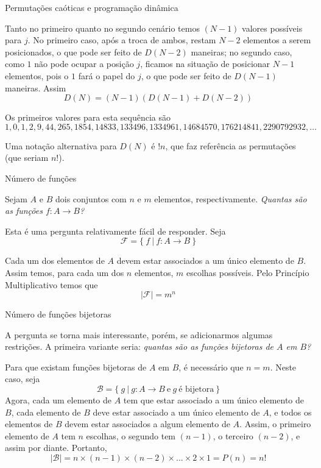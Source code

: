 \begin{frame}[fragile]{Permutações caóticas e programação dinâmica}

Tanto no primeiro quanto no segundo cenário temos $(N - 1)$ valores possíveis para $j$. No primeiro
caso, após a troca de ambos, restam $N - 2$ elementos a serem posicionados, o que pode ser 
feito de $D(N - 2)$ maneiras; no segundo caso, como $1$ não pode ocupar a posição $j$, ficamos
na situação de posicionar $N - 1$ elementos, pois o $1$ fará o papel do $j$, o que pode ser
feito de $D(N - 1)$ maneiras. Assim
\[
        D(N) = (N - 1)(D(N - 1) + D(N - 2))
\]

Os primeiros valores para esta sequência são
\[
1, 0, 1, 2, 9, 44, 265, 1854, 14833, 133496, 1334961, 14684570, 176214841, 2290792932, \ldots
\]

Uma notação alternativa para $D(N)$ é $!n$, que faz referência as permutações (que seriam $n!$).

\end{frame}

\begin{frame}[fragile]{Número de funções}

Sejam $A$ e $B$ dois conjuntos com $n$ e $m$ elementos, respectivamente. {\it Quantas são as funções $f: A \to B$?}

Esta é uma pergunta relativamente fácil de responder. Seja 
\[
\mathcal{F} = \{\ f\ |\  f: A \to B\ \}
\]

Cada um dos elementos de $A$ devem estar
associados a um único elemento de $B$. Assim temos, para cada um dos $n$ elementos, $m$ escolhas
possíveis. Pelo Princípio Multiplicativo temos que
\[
        |\mathcal{F}| = m^n
\]

\end{frame}


\begin{frame}[fragile]{Número de funções bijetoras}

A pergunta se torna mais interessante, porém, se adicionarmos algumas restrições. A primeira
variante seria: {\it quantas são as funções bijetoras de $A$ em $B$?}

Para que existam funções bijetoras de $A$ em $B$, é necessário que $n = m$. Neste caso, seja 
\[
\mathcal{B} = \{\ g\ |\ g: A \to B \ \mbox{e}\ g\ \mbox{é bijetora}\ \}
\]
Agora, cada um elemento de $A$ tem que estar associado a um
único elemento de $B$, cada elemento de $B$ deve estar associado a um único elemento de $A$,
e todos os elementos de $B$ devem estar associados a algum elemento de $A$.
Assim, o primeiro elemento de $A$ tem $n$ escolhas, o segundo tem $(n - 1)$, o terceiro $(n - 2)$,
e assim por diante. Portanto,
\[
        |\mathcal{B}| = n \times (n - 1) \times (n - 2) \times ... \times 2 \times 1 = P(n) = n!
\]

\end{frame}

